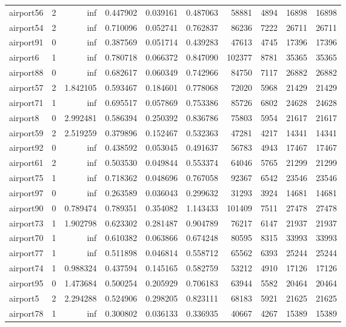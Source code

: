 \begin{longtable}{|l|r|r|r|r|r|r|r|r|r|}
airport56 & 2 & inf & 0.447902 & 0.039161 & 0.487063 & 58881 & 4894 & 16898 & 16898 \\
airport54 & 2 & inf & 0.710096 & 0.052741 & 0.762837 & 86236 & 7222 & 26711 & 26711 \\
airport91 & 0 & inf & 0.387569 & 0.051714 & 0.439283 & 47613 & 4745 & 17396 & 17396 \\
airport6 & 1 & inf & 0.780718 & 0.066372 & 0.847090 & 102377 & 8781 & 35365 & 35365 \\
airport88 & 0 & inf & 0.682617 & 0.060349 & 0.742966 & 84750 & 7117 & 26882 & 26882 \\
airport57 & 2 & 1.842105 & 0.593467 & 0.184601 & 0.778068 & 72020 & 5968 & 21429 & 21429 \\
airport71 & 1 & inf & 0.695517 & 0.057869 & 0.753386 & 85726 & 6802 & 24628 & 24628 \\
airport8 & 0 & 2.992481 & 0.586394 & 0.250392 & 0.836786 & 75803 & 5954 & 21617 & 21617 \\
airport59 & 2 & 2.519259 & 0.379896 & 0.152467 & 0.532363 & 47281 & 4217 & 14341 & 14341 \\
airport92 & 0 & inf & 0.438592 & 0.053045 & 0.491637 & 56783 & 4943 & 17467 & 17467 \\
airport61 & 2 & inf & 0.503530 & 0.049844 & 0.553374 & 64046 & 5765 & 21299 & 21299 \\
airport75 & 1 & inf & 0.718362 & 0.048696 & 0.767058 & 92367 & 6542 & 23546 & 23546 \\
airport97 & 0 & inf & 0.263589 & 0.036043 & 0.299632 & 31293 & 3924 & 14681 & 14681 \\
airport90 & 0 & 0.789474 & 0.789351 & 0.354082 & 1.143433 & 101409 & 7511 & 27478 & 27478 \\
airport73 & 1 & 1.902798 & 0.623302 & 0.281487 & 0.904789 & 76217 & 6147 & 21937 & 21937 \\
airport70 & 1 & inf & 0.610382 & 0.063866 & 0.674248 & 80595 & 8315 & 33993 & 33993 \\
airport77 & 1 & inf & 0.511898 & 0.046814 & 0.558712 & 65562 & 6393 & 25244 & 25244 \\
airport74 & 1 & 0.988324 & 0.437594 & 0.145165 & 0.582759 & 53212 & 4910 & 17126 & 17126 \\
airport95 & 0 & 1.473684 & 0.500254 & 0.205929 & 0.706183 & 63944 & 5582 & 20464 & 20464 \\
airport5 & 2 & 2.294288 & 0.524906 & 0.298205 & 0.823111 & 68183 & 5921 & 21625 & 21625 \\
airport78 & 1 & inf & 0.300802 & 0.036133 & 0.336935 & 40667 & 4267 & 15389 & 15389 \\

\end{longtable}
